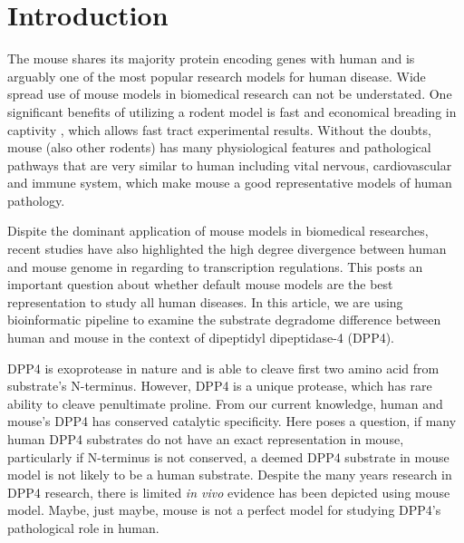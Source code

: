 \section{Introduction}

The mouse shares its majority protein encoding genes with human and is arguably one of the most popular research models for human disease. Wide spread use of mouse models in biomedical research can not be understated. \cite{MORSEIII_2007} One significant benefits of utilizing a rodent model is fast and economical breading in captivity \cite{Rosenthal_2007}, which allows fast tract experimental results. \cite{Vandamme_2014} Without the doubts, mouse (also other rodents) has many physiological features and pathological pathways that are very similar to human including vital nervous, cardiovascular and immune system, which make mouse a good representative models of human pathology. \cite{MORSEIII_2007,Rosenthal_2007}

Dispite the dominant application of mouse models in biomedical researches, recent studies have also highlighted the high degree divergence between human and mouse genome in regarding to transcription regulations. \cite{25409824} This posts an important question about whether default mouse models are the best representation to study all human diseases. In this article, we are using bioinformatic pipeline to examine the substrate degradome difference between human and mouse in the context of dipeptidyl dipeptidase-4 (DPP4).  

DPP4 is exoprotease in nature and is able to cleave first two amino acid from substrate's N-terminus. However, DPP4 is a unique protease, which has rare ability to cleave penultimate proline. From our current knowledge, human and mouse's DPP4 has conserved catalytic specificity. Here poses a question, if many human DPP4 substrates do not have an exact representation in mouse, particularly if N-terminus is not conserved, a deemed DPP4 substrate in mouse model is not likely to be a human substrate. Despite the many years research in DPP4 research, there is limited \textit{in vivo} evidence has been depicted using mouse model. Maybe, just maybe, mouse is not a perfect model for studying DPP4's pathological role in human. 

\cite{Justice_2011}